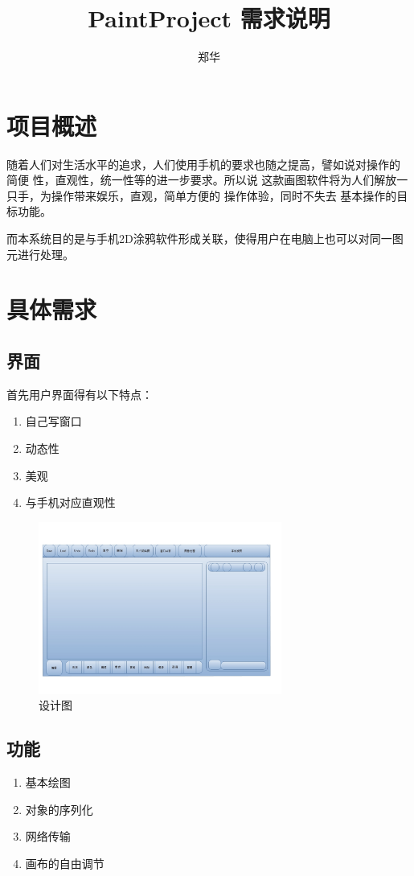 \documentclass[UTF8,a4paper,8pt]{ctexart}
\author{郑华}
\title{PaintProject 需求说明}
\begin{document}
 
 	\maketitle
   
   \section{项目概述}
      随着人们对生活水平的追求，人们使用手机的要求也随之提高，譬如说对操作的 简便 性，直观性，统一性等的进一步要求。所以说 这款画图软件将为人们解放一只手，为操作带来娱乐，直观，简单方便的 操作体验，同时不失去 基本操作的目标功能。

      而本系统目的是与手机2D涂鸦软件形成关联，使得用户在电脑上也可以对同一图元进行处理。
 
   \section{具体需求}	     
      \subsection{界面}
         首先用户界面得有以下特点：
       	\begin{enumerate}
       		\item 自己写窗口
       		\item 动态性
       		\item 美观
       		\item 与手机对应直观性
        \end{enumerate}
        
        	\begin{figure}[h] 	
        		\centering
        		\includegraphics[width=8cm,clip]{MFC_PaintProjectIdea.jpg} 	
        		\caption{设计图}	
        		\label{fig:myphoto}
        	\end{figure} 
        	
      \subsection{功能}
       	\begin{enumerate}
        	\item 基本绘图
        	\item 对象的序列化
        	\item 网络传输
        	\item 画布的自由调节
        \end{enumerate}
\end{document}
